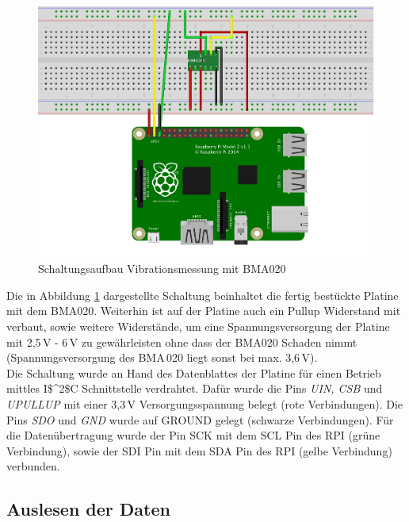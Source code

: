 \begin{figure}[!h] 
  \centering
     \includegraphics[scale=.8]{BilderAllgemein/Schaltung_Vib.png}
  \caption{Schaltungsaufbau Vibrationsmessung mit  BMA020}
  \label{Abb_Schaltungsaufbau_BMA020}
\end{figure}

Die in Abbildung \ref{Abb_Schaltungsaufbau_BMA020} dargestellte Schaltung beinhaltet die fertig bestückte Platine mit dem BMA020. Weiterhin ist auf der Platine auch ein Pullup Widerstand mit verbaut, sowie weitere Widerstände, um eine Spannungsversorgung der Platine mit 2,5\,V - 6\,V zu gewährleisten ohne dass der BMA020 Schaden nimmt (Spannungsversorgung des BMA\,020 liegt sonst bei max. 3,6\,V).\\
Die Schaltung wurde an Hand des Datenblattes der Platine für einen Betrieb mittles \ac{I$^2$C} Schnittstelle verdrahtet. Dafür wurde die Pins \textit{UIN, CSB} und \textit{UPULLUP} mit einer 3,3\,V Versorgungsspannung belegt (rote Verbindungen). Die Pins \textit{SDO} und \textit{GND} wurde auf GROUND gelegt (schwarze Verbindungen). Für die Datenübertragung wurde der Pin SCK mit dem SCL Pin des \ac{RPI} (grüne Verbindung), sowie der SDI Pin mit dem SDA Pin des \ac{RPI} (gelbe Verbindung) verbunden.

\subsection{Auslesen der Daten}
\label{subsection_Auslesen_Daten_BMA020}

